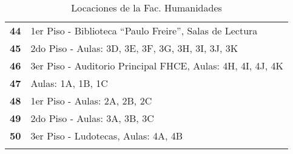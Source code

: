 \begin{longtable}{ c  X }
      \addlinespace
      \textbf{44}
      &
      1{\tiny er} Piso - Biblioteca ``Paulo Freire'', Salas de Lectura
      \\

      \addlinespace
      \textbf{45}
      &
      2{\tiny do} Piso - Aulas: 3D, 3E, 3F, 3G, 3H, 3I, 3J, 3K
      \\


      \addlinespace
      \textbf{46}
      &
      3{\tiny er} Piso - Auditorio Principal FHCE,  Aulas: 4H, 4I, 4J, 4K
      \\

      \addlinespace
      \textbf{47}
      &
      Aulas: 1A, 1B, 1C
      \\

      \addlinespace
      \textbf{48}
      &
      1{\tiny er} Piso - Aulas: 2A, 2B, 2C
      \\

      \addlinespace
      \textbf{49}
      &
      2{\tiny do} Piso - Aulas: 3A, 3B, 3C
      \\

      \addlinespace
      \textbf{50}
      &
      3{\tiny er} Piso - Ludotecas, Aulas: 4A, 4B
      \\

      \bottomrule
      \caption{Locaciones de la Fac. Humanidades}
      \label{tab:lugares_humanidades}
    \end{longtable}

